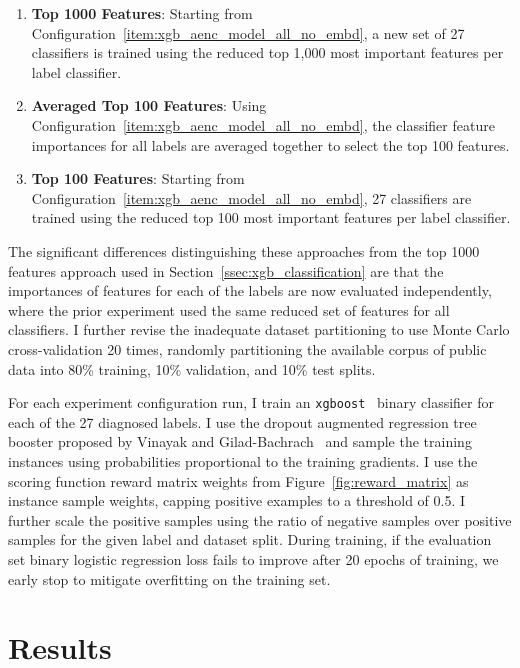 \documentclass[\main/thesis.tex]{subfiles}
\begin{document}
\begin{enumerate}
    \item \label{item:xgb_aenc_model_top_1000_no_embd} \textbf{Top 1000 Features}: Starting from Configuration~\ref{item:xgb_aenc_model_all_no_embd}, a new set of 27 classifiers is trained using the reduced top 1,000 most important features per label classifier.
    \item \label{item:xgb_aenc_model_avgd_top_100_no_embd} \textbf{Averaged Top 100 Features}: Using Configuration~\ref{item:xgb_aenc_model_all_no_embd}, the classifier feature importances for all labels are averaged together to select the top 100 features.
    \item \label{item:xgb_aenc_model_top_100_no_embd} \textbf{Top 100 Features}: Starting from Configuration~\ref{item:xgb_aenc_model_all_no_embd}, 27 classifiers are trained using the reduced top 100 most important features per label classifier.
\end{enumerate}

The significant differences distinguishing these approaches from the top 1000 features approach used in Section~\ref{ssec:xgb_classification} are that the importances of features for each of the labels are now evaluated independently, where the prior experiment used the same reduced set of features for all classifiers.
I further revise the inadequate dataset partitioning to use Monte Carlo cross-validation 20 times, randomly partitioning the available corpus of public data into 80\% training, 10\% validation, and 10\% test splits.

For each experiment configuration run, I train an \texttt{xgboost}~\cite{chen_xgboost_2016} binary classifier for each of the 27 diagnosed labels.
I use the dropout augmented regression tree booster proposed by Vinayak and Gilad-Bachrach~\cite{vinayak_dart_2015} and sample the training instances using probabilities proportional to the training gradients.
I use the scoring function reward matrix weights from Figure~\ref{fig:reward_matrix} as instance sample weights, capping positive examples to a threshold of 0.5.
I further scale the positive samples using the ratio of negative samples over positive samples for the given label and dataset split.
During training, if the evaluation set binary logistic regression loss fails to improve after 20 epochs of training, we early stop to mitigate overfitting on the training set.

\section{Results}
\end{document}
